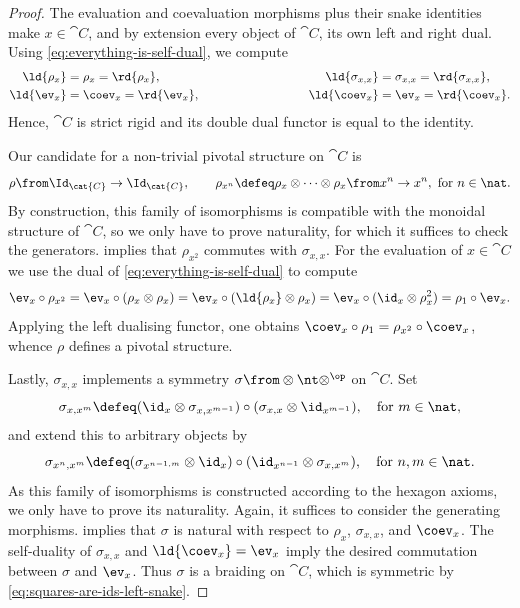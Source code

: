 \begin{proof}
  The evaluation and coevaluation morphisms plus their snake identities make \(x \in \cat{C}\),
  and by extension every object of \(\cat{C}\),
  its own left and right dual.
  Using \cref{eq:everything-is-self-dual}, we compute
  \begin{align*}
    \ld{\rho_x} &= \rho_x = \rd{\rho_x}, \qquad \qquad \qquad \qquad &\ld{ \sigma_{x,x}} &= \sigma_{x,x} =\rd{\sigma_{x,x}},\\
    \ld{\ev_x} &= \coev_x = \rd{\ev_x}, \qquad \qquad \qquad \qquad &\ld{\coev_x} &= \ev_x = \rd{\coev_x}.
  \end{align*}
  Hence, \(\cat{C}\) is strict rigid and its double dual functor is equal to the identity.

  Our candidate for a non-trivial pivotal structure on \(\cat{C}\) is
  \[
    \rho \from \Id_\cat{C} \to \Id_\cat{C}, \qquad
    \rho_{x^n} \defeq \rho_x \otimes \dots \otimes \rho_x \from x^n \to x^n , \text{ for } n \in \nat.
  \]
  By construction, this family of isomorphisms is compatible with the monoidal structure of \(\cat{C}\),
  so we only have to prove naturality,
  for which it suffices to check the generators.
   implies that \(\rho_{x^2}\) commutes with \(\sigma_{x,x}\).
  For the evaluation of \(x\in \cat{C}\) we use the dual of \cref{eq:everything-is-self-dual} to compute
  \[
    \ev_x \circ \rho_{x^2}
    = \ev_x \circ (\rho_x \otimes \rho_x)
    = \ev_x \circ (\ld{\rho_x} \otimes \rho_x)
    = \ev_x \circ (\id_x \otimes \rho^2_x)
    = \rho_1 \circ \ev_x.
  \]
  Applying the left dualising functor,
  one obtains \(\coev_x \circ \rho_1 = \rho_{x^2} \circ \coev_x\),
  whence \(\rho\) defines a pivotal structure.

  Lastly, \(\sigma_{x,x}\) implements a symmetry \(\sigma \from \otimes \nt \otimes^{\op}\) on \(\cat{C}\).
  Set
  \[
    \sigma_{x,x^m}\defeq (\id_x\otimes\sigma_{x, x^{m-1}}) \circ (\sigma_{x,x}\otimes \id_{x^{m-1}}), \quad\text{for } m \in \nat,
  \]
  and extend this to arbitrary objects by
  \[
    \sigma_{x^n,x^m}\defeq (\sigma_{x^{n-1,m}}\otimes \id_x) \circ (\id_{x^{n-1}}\otimes \sigma_{x,x^m}), \quad \text{for } n,m \in \nat.
  \]
  As this family of isomorphisms is constructed according to the hexagon axioms, we only have to prove its naturality.
  Again, it suffices to consider the generating morphisms.
   implies that \(\sigma\) is natural with respect to \(\rho_x\), \(\sigma_{x,x}\), and \(\coev_x\).
  The self-duality of \(\sigma_{x,x}\) and \(\ld{\coev_x} = \ev_x\) imply the desired commutation between \(\sigma\) and \(\ev_x\).
  Thus \(\sigma\) is a braiding on \(\cat{C}\), which is symmetric by \cref{eq:squares-are-ids-left-snake}.
\end{proof}

